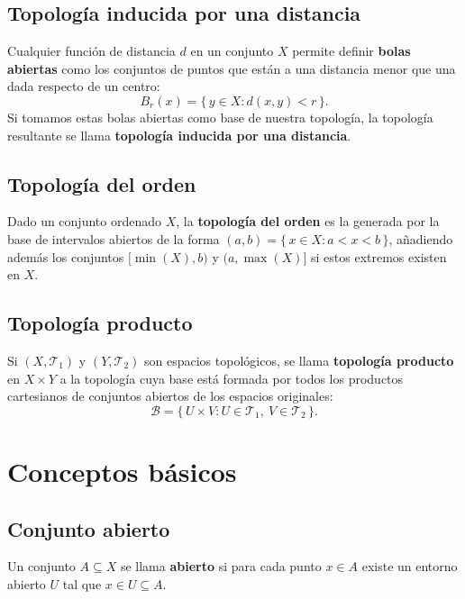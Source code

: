 \documentclass[12pt]{article}
\begin{document}
\subsection*{Topología inducida por una distancia}
\begin{tcolorbox}[definitionstyle]  
Cualquier función de distancia \( d \) en un conjunto \( X \) permite definir \textbf{bolas abiertas} como los conjuntos de puntos que están a una distancia menor que una dada respecto de un centro:
\[
B_r(x) = \{\, y \in X : d(x,y) < r \,\}.
\]
Si tomamos estas bolas abiertas como base de nuestra topología, la topología resultante se llama \textbf{topología inducida por una distancia}.
\end{tcolorbox}
\subsection*{Topología del orden}
\begin{tcolorbox}[definitionstyle] 
Dado un conjunto ordenado \( X \), la \textbf{topología del orden} es la generada por la base de intervalos abiertos de la forma \( (a, b) = \{\, x \in X : a < x < b \,\} \),  
añadiendo además los conjuntos \( [\min(X), b) \) y \( (a, \max(X)] \) si estos extremos existen en \( X \).
\end{tcolorbox}
\subsection*{Topología producto}
\begin{tcolorbox}[definitionstyle] 
Si \( (X, \mathcal{T}_1) \) y \( (Y, \mathcal{T}_2) \) son espacios topológicos, se llama \textbf{topología producto} en \( X \times Y \) a la topología cuya base está formada por todos los productos cartesianos de conjuntos abiertos de los espacios originales:
\[
\mathcal{B} = \{\, U \times V : U \in \mathcal{T}_1,\ V \in \mathcal{T}_2 \,\}.
\]
\end{tcolorbox}
\section*{Conceptos básicos}
\subsection*{Conjunto abierto}
\begin{tcolorbox}[definitionstyle]
Un conjunto \( A \subseteq X \) se llama \textbf{abierto} si para cada punto \( x \in A \) existe un entorno abierto \( U \) tal que \( x \in U \subseteq A \).
\end{tcolorbox}
\end{document}
